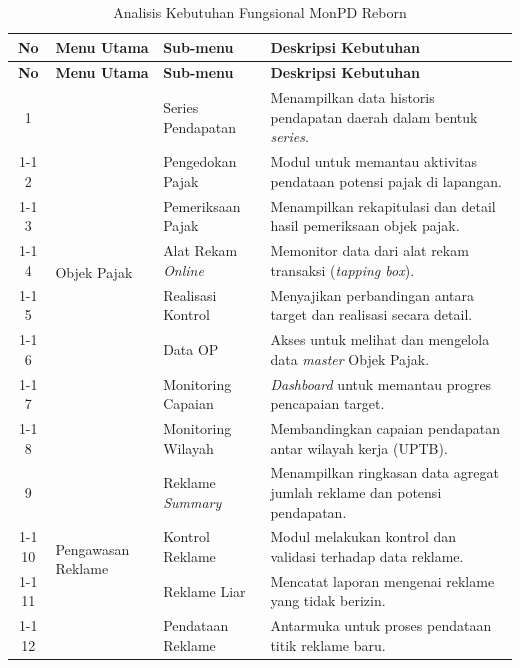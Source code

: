 \begin{longtable}{|c|p{2cm}|p{2cm}|p{4cm}|}
\caption{Analisis Kebutuhan Fungsional MonPD Reborn}
\label{tab:kebutuhan_fungsional} \\
\hline
\textbf{No} & \textbf{Menu Utama} & \textbf{Sub-menu} & \textbf{Deskripsi Kebutuhan} \\ \hline
\endfirsthead

\hline
\textbf{No} & \textbf{Menu Utama} & \textbf{Sub-menu} & \textbf{Deskripsi Kebutuhan} \\ \hline
\endhead

\hline
\endfoot

\hline
\endlastfoot

1 & \multirow{8}{2cm}{Objek Pajak} & Series Pendapatan & Menampilkan data historis pendapatan daerah dalam bentuk \emph{series}. \\ \cline{1-1} \cline{3-4}
2 &  & Pengedokan Pajak & Modul untuk memantau aktivitas pendataan potensi pajak di lapangan. \\ \cline{1-1} \cline{3-4}
3 &  & Pemeriksaan Pajak & Menampilkan rekapitulasi dan detail hasil pemeriksaan objek pajak. \\ \cline{1-1} \cline{3-4}
4 &  & Alat Rekam \emph{Online} & Memonitor data dari alat rekam transaksi (\emph{tapping box}). \\ \cline{1-1} \cline{3-4}
5 &  & Realisasi Kontrol & Menyajikan perbandingan antara target dan realisasi secara detail. \\ \cline{1-1} \cline{3-4}
6 &  & Data OP & Akses untuk melihat dan mengelola data \emph{master} Objek Pajak. \\ \cline{1-1} \cline{3-4}
7 &  & Monitoring Capaian & \emph{Dashboard} untuk memantau progres pencapaian target. \\ \cline{1-1} \cline{3-4}
8 &  & Monitoring Wilayah & Membandingkan capaian pendapatan antar wilayah kerja (UPTB). \\ \hline

9 & \multirow{4}{2cm}{Pengawasan Reklame} & Reklame \emph{Summary} & Menampilkan ringkasan data agregat jumlah reklame dan potensi pendapatan. \\ \cline{1-1} \cline{3-4}
10 &  & Kontrol Reklame & Modul melakukan kontrol dan validasi terhadap data reklame. \\ \cline{1-1} \cline{3-4}
11 &  & Reklame Liar & Mencatat laporan mengenai reklame yang tidak berizin. \\ \cline{1-1} \cline{3-4}
12 &  & Pendataan Reklame & Antarmuka untuk proses pendataan titik reklame baru. \\ \hline


\end{longtable}
